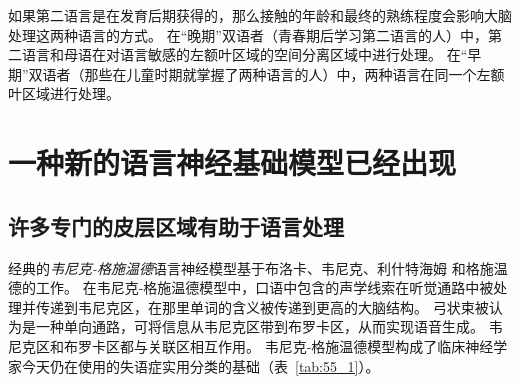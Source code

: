 如果第二语言是在发育后期获得的，那么接触的年龄和最终的熟练程度会影响大脑处理这两种语言的方式。
在“晚期”双语者（青春期后学习第二语言的人）中，第二语言和母语在对语言敏感的左额叶区域的空间分离区域中进行处理。
在“早期”双语者（那些在儿童时期就掌握了两种语言的人）中，两种语言在同一个左额叶区域进行处理。



\section{一种新的语言神经基础模型已经出现}

\subsection{许多专门的皮层区域有助于语言处理}

经典的\textit{韦尼克-格施温德}语言神经模型基于布洛卡\cite{broca1861remarques}、韦尼克\cite{wernicke1974aphasische}、利什特海姆\cite{lichtheim1885aphasia} 和格施温德\cite{geschwind1970organization}的工作。
在韦尼克-格施温德模型中，口语中包含的声学线索在听觉通路中被处理并传递到韦尼克区，在那里单词的含义被传递到更高的大脑结构。
弓状束被认为是一种单向通路，可将信息从韦尼克区带到布罗卡区，从而实现语音生成。
韦尼克区和布罗卡区都与关联区相互作用。
韦尼克-格施温德模型构成了临床神经学家今天仍在使用的失语症实用分类的基础（表~\ref{tab:55_1}）。


